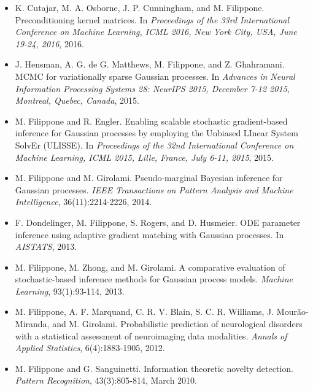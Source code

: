 \documentclass[a4paper,10pt]{article}
\begin{document}
\begin{itemize}
\item  K. Cutajar, M. A. Osborne, J. P. Cunningham, and M. Filippone. Preconditioning kernel matrices. In \emph{Proceedings of the 33rd International Conference on Machine Learning, ICML 2016, New York City, USA, June 19-24, 2016}, 2016.  
\item  J. Hensman, A. G. de G. Matthews, M. Filippone, and Z. Ghahramani. MCMC for variationally sparse Gaussian processes. In \emph{Advances in Neural Information Processing Systems 28: NeurIPS 2015, December 7-12 2015, Montreal, Quebec, Canada}, 2015.  
\item  M. Filippone and R. Engler. Enabling scalable stochastic gradient-based inference for Gaussian processes by employing the Unbiased LInear System SolvEr (ULISSE). In \emph{Proceedings of the 32nd International Conference on Machine Learning, ICML 2015, Lille, France, July 6-11, 2015}, 2015.  
\item  M. Filippone and M. Girolami. Pseudo-marginal Bayesian inference for Gaussian processes. \emph{IEEE Transactions on Pattern Analysis and Machine Intelligence}, 36(11):2214-2226, 2014.  
\item  F. Dondelinger, M. Filippone, S. Rogers, and D. Husmeier. ODE parameter inference using adaptive gradient matching with Gaussian processes. In \emph{AISTATS}, 2013.  
\item  M. Filippone, M. Zhong, and M. Girolami. A comparative evaluation of stochastic-based inference methods for Gaussian process models. \emph{Machine Learning}, 93(1):93-114, 2013.  
\item  M. Filippone, A. F. Marquand, C. R. V. Blain, S. C. R. Williams, J. Mour\~ao-Miranda, and M. Girolami. Probabilistic prediction of neurological disorders with a statistical assessment of neuroimaging data modalities. \emph{Annals of Applied Statistics}, 6(4):1883-1905, 2012.  
\item  M. Filippone and G. Sanguinetti. Information theoretic novelty detection. \emph{Pattern Recognition}, 43(3):805-814, March 2010.  
\end{itemize}




\end{document}
